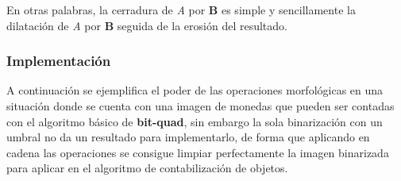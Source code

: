 		\hfill\break
		\justifying
		En otras palabras, la cerradura de \textit{A} por \textbf{B} es simple y sencillamente la dilatación de \textit{A} por \textbf{B} seguida de la erosión del resultado.

\subsubsection{Implementación}
	\hfill\break
	\justifying
	A continuación se ejemplifica el poder de las operaciones morfológicas en una situación donde se cuenta con una imagen de monedas que pueden ser contadas con el algoritmo básico de \textbf{bit-quad}, sin embargo la sola binarización con un umbral no da un resultado para implementarlo, de forma que aplicando en cadena las operaciones se consigue limpiar perfectamente la imagen binarizada para aplicar en el algoritmo de contabilización de objetos.
	
